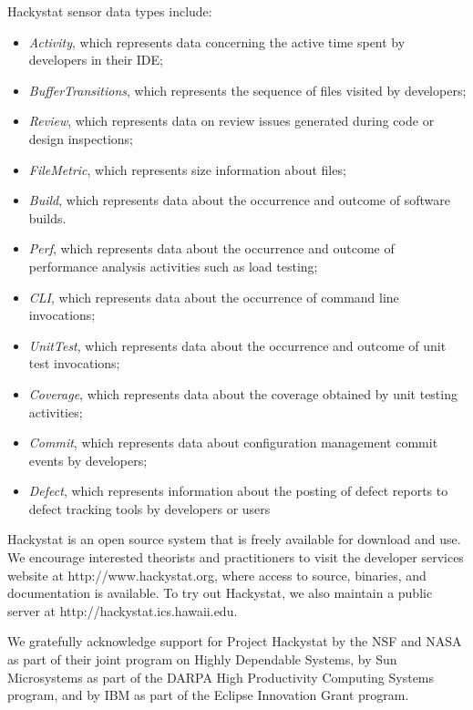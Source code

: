 \documentclass[11pt,twocolumn]{article}
\begin{document}
Hackystat sensor data types include:
\begin{itemize}
\item {\em Activity}, which represents data concerning the active time spent
by developers in their IDE;
\item {\em BufferTransitions}, which represents the sequence of files visited
by developers;
\item {\em Review}, which represents data on review issues generated during
code or design inspections;
\item {\em FileMetric}, which represents size information about files;
\item {\em Build}, which represents data about the occurrence and
outcome of software builds.
\item {\em Perf}, which represents data about the occurrence and outcome of
performance analysis activities such as load testing;
\item {\em CLI}, which represents data about the occurrence of command line
invocations;
\item {\em UnitTest}, which represents data about the occurrence and
outcome of unit test invocations;
\item {\em Coverage}, which represents data about the coverage obtained by
unit testing activities;
\item {\em Commit}, which represents data about configuration management
commit events by developers;
\item {\em Defect}, which represents information about the posting of
defect reports to defect tracking tools by developers or users
\end{itemize}

Hackystat is an open source system that is freely available for
download and use. We encourage interested theorists and practitioners to
visit the developer services website at http://www.hackystat.org,
where access to source, binaries, and documentation is available. To try out
Hackystat, we also maintain a public server at http://hackystat.ics.hawaii.edu.



We gratefully acknowledge support for Project Hackystat by the NSF and NASA
as part of their joint program on Highly Dependable Systems, by Sun
Microsystems as part of the DARPA High Productivity Computing Systems
program, and by IBM as part of the Eclipse Innovation Grant program.



\end{document}
